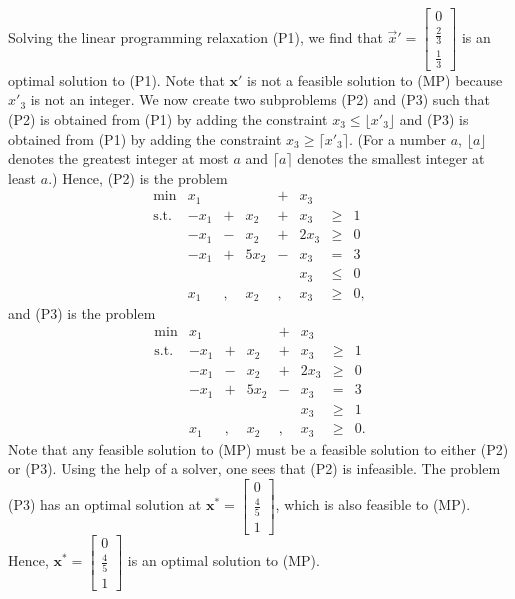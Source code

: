 Solving the linear programming relaxation (P1), we find that
\(\vec{x}' = \begin{bmatrix}0\\ \frac{2}{3}\\ \frac{1}{3}\end{bmatrix}\)
is an optimal solution to (P1). Note that \(\mathbf{x}'\) is not a
feasible solution to (MP) because \(x'_3\) is not an integer. We now
create two subproblems (P2) and (P3) such that (P2) is obtained from
(P1) by adding the constraint \(x_3 \leq \lfloor x'_3\rfloor\) and (P3)
is obtained from (P1) by adding the constraint
\(x_3 \geq \lceil x'_3\rceil\). (For a number \(a\),
\(\lfloor a \rfloor\) denotes the greatest integer at most \(a\) and
\(\lceil a \rceil\) denotes the smallest integer at least \(a\).) Hence,
(P2) is the problem \[\begin{array}{rrcrcrlll}
\min & x_1 &  &  & + & x_3  \\
\text{s.t.} & -x_1 & + &  x_2 & + &  x_3  & \geq & 1 \\
 & -x_1 & - &  x_2 & + & 2x_3  & \geq & 0 \\
 & -x_1 & + & 5x_2 & - &  x_3  & = & 3 \\
 &      &   &      &   &  x_3  & \leq & 0 \\
 &  x_1 & , & x_2 & , & x_3 & \geq & 0,
\end{array}\] and (P3) is the problem \[\begin{array}{rrcrcrlll}
\min & x_1 &  &  & + & x_3  \\
\text{s.t.} & -x_1 & + &  x_2 & + &  x_3  & \geq & 1 \\
 & -x_1 & - &  x_2 & + & 2x_3  & \geq & 0 \\
 & -x_1 & + & 5x_2 & - &  x_3  & = & 3 \\
 &      &   &      &   &  x_3  & \geq & 1 \\
 &  x_1 & , & x_2 & , & x_3 & \geq & 0.
\end{array}\] Note that any feasible solution to (MP) must be a feasible
solution to either (P2) or (P3). Using the help of a solver, one sees
that (P2) is infeasible. The problem (P3) has an optimal solution at
\(\mathbf{x}^* = \begin{bmatrix}0\\ \frac{4}{5}\\ 1\end{bmatrix}\),
which is also feasible to (MP). Hence,
\(\mathbf{x}^* = \begin{bmatrix}0\\ \frac{4}{5}\\ 1\end{bmatrix}\) is an
optimal solution to (MP).

